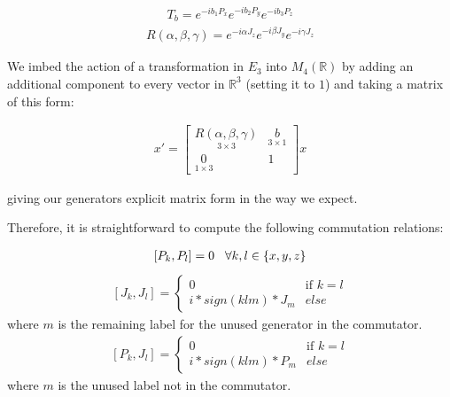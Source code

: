 \documentclass[10pt]{ucthesis}
\newcommand{\R}{\mathbb{R}}
\begin{document}
\begin{equation}
\begin{aligned}
	T_b = e^{-ib_1P_x}e^{-ib_2P_y}e^{-ib_3P_z}
\end{aligned}
\end{equation}
\begin{equation}
\begin{aligned}
	R(\alpha,\beta,\gamma) = e^{-i\alpha J_z}e^{-i\beta J_y}e^{-i\gamma J_z}
\end{aligned}
\end{equation}	

We imbed the action of a transformation in $E_3$ into $M_4(\R)$ by adding an additional component to every vector in $\R^3$ (setting it to $1$) and taking a matrix of this form:

\begin{equation}
\begin{aligned}
	x' =
	\begin{bmatrix}
		\underset{3\times 3}{R(\alpha,\beta,\gamma)} & \underset{3\times 1}{b}\\
		\underset{1\times 3}{0} & 1
	\end{bmatrix} x
\end{aligned}
\end{equation}

giving our generators explicit matrix form in the way we expect.

Therefore, it is straightforward to compute the following commutation relations:

\begin{equation}
\begin{aligned}
	[P_k,P_l] = 0 \hspace{3mm} \forall k,l\in \{x,y,z\}
\end{aligned}
\end{equation}
\begin{equation}
\begin{aligned}
	[J_k,J_l] = \begin{cases}
					0 & \text{if } k = l\\
					i*sign(klm)*J_m & else
					\end{cases}
\end{aligned}
\end{equation}
where $m$ is the remaining label for the unused generator in the commutator.
\begin{equation}
\begin{aligned}
	[P_k,J_l] = \begin{cases}
					0 & \text{if } k = l\\
					i*sign(klm)*P_m & else \end{cases}
\end{aligned}
\end{equation}
where $m$ is the unused label not in the commutator.
\end{document}
